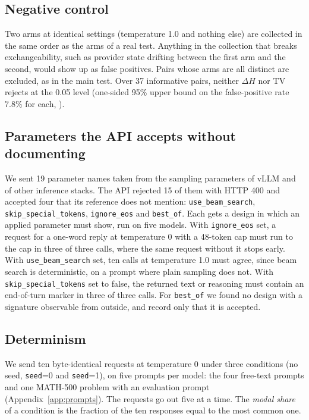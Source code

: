 \documentclass[10pt]{article}
\newcommand{\p}[1]{\texttt{#1}}
\begin{document}
\subsection{Negative control}

Two arms at identical settings (temperature 1.0 and nothing else) are collected in the same order as the arms of a real test. Anything in the collection that breaks exchangeability, such as provider state drifting between the first arm and the second, would show up as false positives. Pairs whose arms are all distinct are excluded, as in the main test. Over 37 informative pairs, neither $\Delta H$ nor TV rejects at the 0.05 level (one-sided 95\% upper bound on the false-positive rate 7.8\% for each, \citealp{clopper1934}).

\subsection{Parameters the API accepts without documenting}

We sent 19 parameter names taken from the sampling parameters of vLLM and of other inference stacks. The API rejected 15 of them with HTTP 400 and accepted four that its reference does not mention: \p{use\_beam\_search}, \p{skip\_special\_tokens}, \p{ignore\_eos} and \p{best\_of}. Each gets a design in which an applied parameter must show, run on five models. With \p{ignore\_eos} set, a request for a one-word reply at temperature 0 with a 48-token cap must run to the cap in three of three calls, where the same request without it stops early. With \p{use\_beam\_search} set, ten calls at temperature 1.0 must agree, since beam search is deterministic, on a prompt where plain sampling does not. With \p{skip\_special\_tokens} set to false, the returned text or reasoning must contain an end-of-turn marker in three of three calls. For \p{best\_of} we found no design with a signature observable from outside, and record only that it is accepted.

\subsection{Determinism}

We send ten byte-identical requests at temperature 0 under three conditions (no seed, \p{seed}=0 and \p{seed}=1), on five prompts per model: the four free-text prompts and one MATH-500 problem \citep{hendrycks2021math,lightman2024lets} with an evaluation prompt (Appendix~\ref{app:prompts}). The requests go out five at a time. The \emph{modal share} of a condition is the fraction of the ten responses equal to the most common one.
\end{document}
